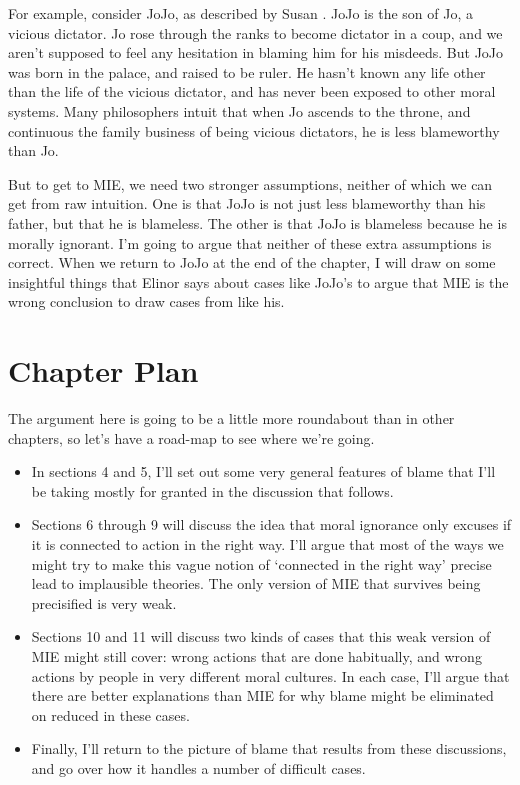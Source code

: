 For example, consider \gls{JoJo}, as described by Susan \citet{Wolf1987}. \gls{JoJo} is the son of Jo, a vicious dictator. Jo rose through the ranks to become dictator in a coup, and we aren't supposed to feel any hesitation in blaming him for his misdeeds. But \gls{JoJo} was born in the palace, and raised to be ruler. He hasn't known any life other than the life of the vicious dictator, and has never been exposed to other moral systems. Many philosophers intuit that when Jo ascends to the throne, and continuous the family business of being vicious dictators, he is less blameworthy than Jo.

But to get to MIE, we need two stronger assumptions, neither of which we can get from raw intuition. One is that \gls{JoJo} is not just less blameworthy than his father, but that he is blameless. The other is that \gls{JoJo} is blameless because he is morally ignorant. I'm going to argue that neither of these extra assumptions is correct. When we return to \gls{JoJo} at the end of the chapter, I will draw on some insightful things that Elinor \citet{Mason2015} says about cases like \gls{JoJo}'s to argue that MIE is the wrong conclusion to draw cases from like his.

\section{Chapter Plan}
\label{chapterplan}

The argument here is going to be a little more roundabout than in other chapters, so let's have a road-map to see where we're going.

\begin{itemize}
\item{} In sections 4 and 5, I'll set out some very general features of blame that I'll be taking mostly for granted in the discussion that follows.

\item{} Sections 6 through 9 will discuss the idea that moral ignorance only excuses if it is connected to action in the right way. I'll argue that most of the ways we might try to make this vague notion of `connected in the right way' precise lead to implausible theories. The only version of MIE that survives being precisified is very weak.

\item{} Sections 10 and 11 will discuss two kinds of cases that this weak version of MIE might still cover: wrong actions that are done habitually, and wrong actions by people in very different moral cultures. In each case, I'll argue that there are better explanations than MIE for why blame might be eliminated on reduced in these cases.

\item{} Finally, I'll return to the picture of blame that results from these discussions, and go over how it handles a number of difficult cases.

\end{itemize}
